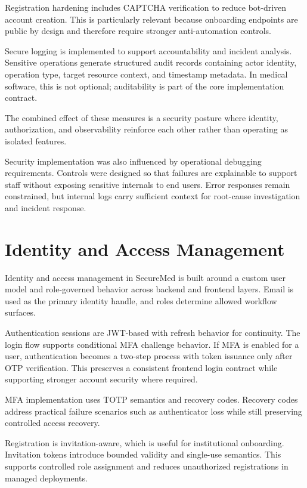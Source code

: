 Registration hardening includes CAPTCHA verification to reduce bot-driven account creation. This is particularly relevant because onboarding endpoints are public by design and therefore require stronger anti-automation controls.

Secure logging is implemented to support accountability and incident analysis. Sensitive operations generate structured audit records containing actor identity, operation type, target resource context, and timestamp metadata. In medical software, this is not optional; auditability is part of the core implementation contract.

The combined effect of these measures is a security posture where identity, authorization, and observability reinforce each other rather than operating as isolated features.

Security implementation was also influenced by operational debugging requirements. Controls were designed so that failures are explainable to support staff without exposing sensitive internals to end users. Error responses remain constrained, but internal logs carry sufficient context for root-cause investigation and incident response.

\section{Identity and Access Management}\label{54-identity-and-access-management}

Identity and access management in SecureMed is built around a custom user model and role-governed behavior across backend and frontend layers. Email is used as the primary identity handle, and roles determine allowed workflow surfaces.

Authentication sessions are JWT-based with refresh behavior for continuity. The login flow supports conditional MFA challenge behavior. If MFA is enabled for a user, authentication becomes a two-step process with token issuance only after OTP verification. This preserves a consistent frontend login contract while supporting stronger account security where required.

MFA implementation uses TOTP semantics and recovery codes. Recovery codes address practical failure scenarios such as authenticator loss while still preserving controlled access recovery.

Registration is invitation-aware, which is useful for institutional onboarding. Invitation tokens introduce bounded validity and single-use semantics. This supports controlled role assignment and reduces unauthorized registrations in managed deployments.

